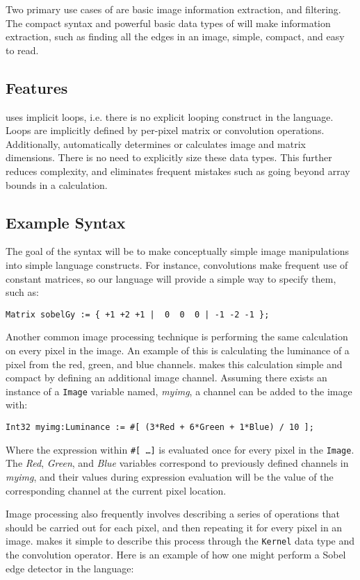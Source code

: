Two primary use cases of \sys{} are basic image information extraction, and
filtering. The compact syntax and powerful basic data types of \sys{} will make
information extraction, such as finding all the edges in an image, simple, compact,
and easy to read.

\subsection*{Features}
\sys{} uses implicit loops, i.e. there is no explicit looping construct in the
language. Loops are implicitly defined by per-pixel matrix or convolution
operations. Additionally, \sys{} automatically determines or calculates image and matrix
dimensions. There is no need to explicitly size these data types. This further
reduces complexity, and eliminates frequent mistakes such as going beyond array
bounds in a calculation.

\subsection*{Example Syntax}

The goal of the \sys{} syntax will be to make conceptually simple image
manipulations into simple language constructs. For instance, convolutions make
frequent use of constant matrices, so our language will provide a simple way
to specify them, such as:
\begin{lstlisting}[language=PLTF11]
    Matrix sobelGy := { +1 +2 +1 |  0  0  0 | -1 -2 -1 };
\end{lstlisting}

Another common image processing technique is performing the same calculation
on every pixel in the image. An example of this is calculating the luminance
of a pixel from the red, green, and blue channels. \sys{} makes this calculation
simple and compact by defining an additional image channel. Assuming there exists
an instance of a \texttt{Image} variable named, \emph{myimg}, a channel can be
added to the image with:
\begin{lstlisting}[language=PLTF11]
    Int32 myimg:Luminance := #[ (3*Red + 6*Green + 1*Blue) / 10 ];
\end{lstlisting}
Where the expression within \texttt{\#[ \ldots ]} is evaluated once for every
pixel in the \texttt{Image}. The \emph{Red}, \emph{Green}, and \emph{Blue} variables
correspond to previously defined channels in \emph{myimg}, and their values during
expression evaluation will be the value of the corresponding channel at the current
pixel location.

Image processing also frequently involves describing a series of operations that
should be carried out for each pixel, and then repeating it for every pixel in an
image. \sys{} makes it simple to describe this process through the \texttt{Kernel}
data type and the convolution operator. Here is an example of how one might perform
a Sobel edge detector in the \sys{} language:

